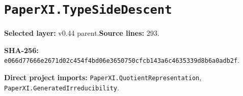 \documentclass[10pt,oneside]{book}
\begin{document}
\section{\texorpdfstring{\nolinkurl{PaperXI.TypeSideDescent}}{PaperXI.TypeSideDescent}}\label{module:PaperXI.TypeSideDescent}

\textbf{Selected layer:} v0.44 parent.\quad\textbf{Source lines:} 293.\par\textbf{SHA-256:} {\scriptsize\nolinkurl{e066d77666e2671d02c454f4bd06e3650750cfcb143a6c4635339d8b6a0adb2f}}.


\textbf{Direct project imports:} \nolinkurl{PaperXI.QuotientRepresentation}, \nolinkurl{PaperXI.GeneratedIrreducibility}.
\end{document}
